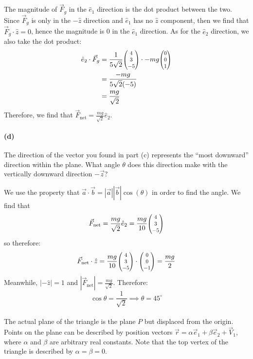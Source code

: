 \documentclass{article}
\begin{document}
\begin{solution}
    The magnitude of $\vec F_g$ in the $\hat e_1$ direction is the dot product between the two. Since $\vec F_g$ is only in the $-\hat z$ direction and $\hat e_1$ has no $\hat z$ component, then we find that $\vec F_g \cdot \hat z = 0$, hence the magnitude is 0 in the $\hat e_1$ direction. As for the $\hat e_2$ direction, we also take the dot product: 
    \begin{align*}
        \hat e_2 \cdot \vec F_g &= \frac{1}{5\sqrt{2}}\smthreevect{4}{3}{-5} \cdot -mg \smthreevect{0}{0}{1} \\
        &= \frac{-mg}{5\sqrt{2}(-5)}\\
        &= \frac{mg}{\sqrt{2}}
    \end{align*}
    Therefore, we find that $\vec F_{\text{net}} = \frac{mg}{\sqrt{2}} \hat e_2$.
\end{solution}


\paragraph{(d)}
The direction of the vector you found in part (c) represents the ``most downward'' direction within the plane.  What angle $\theta$ does this direction make with the 
vertically downward direction $-\vec{z}$?\\  

\begin{solution}
    We use the property that $\vec a \cdot \vec b = |\vec a||\vec b| \cos(\theta)$ in order to find the angle. We find that 
    \[ \vec F_{\text{net}} = \frac{mg}{\sqrt{2}} \hat e_2 = \frac{mg}{10}\smthreevect{4}{3}{-5}\]
    so therefore:
    \begin{align*}
        \vec F_{\text{net}} \cdot \hat z = \frac{mg}{10}\smthreevect{4}{3}{-5} \cdot \smthreevect{0}{0}{-1} = \frac{mg}{2}
    \end{align*}
    Meanwhile, $|-\hat z| = 1$ and $|\vec F_{\text{net}}| = \frac{mg}{\sqrt{2}}$. Therefore:
    \[ \cos \theta = \frac{1}{\sqrt{2}} \implies \theta = 45^\circ\]
\end{solution}


\phline
\paragraph{}
The actual plane of the triangle is the plane $P$ but displaced from the origin.  Points on the plane can be described by position vectors
$\vec{r} = \alpha\vec{e}_{1} + \beta\vec{e}_{2} + \vec{V}_{1}$, where $\alpha$ and $\beta$ are arbitrary real constants.  
Note that the top vertex of the triangle is described by $\alpha=\beta=0$.
\end{document}
